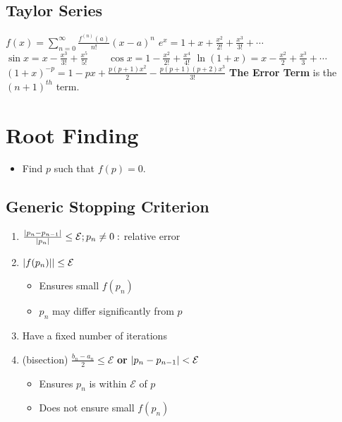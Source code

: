 \documentclass[9pt, letterpaper]{extarticle}
\newcommand{\bigEps}{\mathcal{E}}
\begin{document}
\begin{multicols*}{3}
  \subsection{Taylor Series}
  $\displaystyle f(x) = \sum_{n=0}^\infty \frac{f^{(n)}(a)}{n!}(x-a)^n$\newline
  $e^x = 1 + x + \frac{x^2}{2!} + \frac{x^3}{3!} + \dotsb$\newline
  $\sin x = x - \frac{x^3}{3!} + \frac{x^5}{5!}\qquad\cos x = 1 - \frac{x^2}{2!} +
  \frac{x^4}{4!}$\newline
  $\ln (1+x) = x - \frac{x^2}{2} + \frac{x^3}{3} + \dotsb$ \newline %
  $(1+x)^{-p} = 1-px+\frac{p(p+1)x^2}{2} -\frac{p(p+1)(p+2)x^3}{3!}$ %
  \textbf{The Error Term} is the $(n+1)^{th}$ term.

  \section{Root Finding}
  \begin{itemize}
  \item Find $p$ such that $f(p) = 0$.
  \end{itemize}

  \subsection{Generic Stopping Criterion}
  \begin{enumerate}
    \item $\frac{\abs{p_n-p_{n-1}}}{\abs{p_n}} \leq \bigEps; p_n \neq 0:$
      relative error
    \item $\abs{f(p_n)|} \leq \bigEps$
      \begin{itemize}
        \item Ensures small $f(p_n)$
        \item $p_n$ may differ significantly from $p$
      \end{itemize}
    \item Have a fixed number of iterations
    \item (bisection) 
      $\frac{b_n-a_n}{2} \leq \bigEps$ \textbf{or} $\abs{p_n-p_{n-1}} <\bigEps$
      \begin{itemize}
        \item Ensures $p_n$ is within $\bigEps$ of  $p$
        \item Does not ensure small $f(p_n)$
      \end{itemize}
  \end{enumerate}


\end{multicols*}
\end{document}

